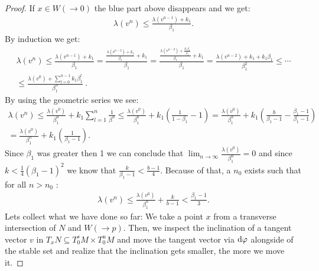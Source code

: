\begin{proof}
	If $x\in W(\to 0)$ the blue part above disappears and we get:
	\begin{align*}
		\lambda(v^n) \leq \frac{\lambda(v^{n-1})+k_1}{\beta_1}.
	\end{align*} By induction we get:
	\begin{align}
		\lambda(v^n)\leq \frac{\lambda(v^{n-1})+k_1}{\beta_1}=\frac{\frac{\lambda(v^{n-2})+k_1}{\beta_1}+k_1}{\beta_1}= \frac{\frac{\lambda(v^{n-2})+\frac{k_1 \beta_1}{\beta_1}}{\beta_1}+k_1}{\beta_1} =\frac{\lambda(v^{n-2})+k_1+ k_1 \beta_1}{\beta_1^2}\leq \cdots \nonumber \\
		\leq \frac{\lambda(v^0)+\sum_{l=0}^{n-1}k_1 \beta_1^l}{\beta_1^n}~. \label{eq: proof lambda lemma estimate lambda(v^n) with x=q}
	\end{align} By using the geometric series we see:
	\begin{align*}
		\lambda(v^n)\leq \frac{\lambda(v^0)}{\beta_1^n}+k_1\sum_{l=1}^n\frac{1}{\beta^n} \leq \frac{\lambda(v^0)}{\beta_1^n}+k_1(\frac{1}{1-\beta_1}-1)=
		\frac{\lambda(v^0)}{\beta_1^n}+k_1(\frac{b}{\beta_1-1}-\frac{\beta_1-1}{\beta_1-1}) \\ =\frac{\lambda(v^0)}{\beta_1^n}+k_1(\frac{1}{\beta_1-1}).
	\end{align*}
	Since $\beta_1$ was greater then 1 we can conclude that $\lim_{n \to \infty}\frac{\lambda(v^0)}{\beta_1^n}=0$ and since $k<\frac{1}{4}(\beta_1-1)^2$ we know that $\frac{k}{\beta_1-1}<\frac{b-1}{4}$. Because of that, a $n_0$ exists such that for all $n>n_0$ :
	\begin{align*}
		\lambda(v^n)\leq \frac{\lambda(v^0)}{\beta_1^n}+\frac{k}{b-1}< \frac{\beta_1-1}{3}.
	\end{align*}  
	Lets collect what we have done so far: We take a point $x$ from a transverse intersection of $N$ and $W(\to p)$. Then, we inspect the inclination of a tangent vector $v$ in ${T_xN\subseteq T^s_0M\times T^u_0M}$ and move the tangent vector via $\mathop{}\!\mathrm{d} \varphi$ alongside of the stable set and realize that the inclination gets smaller, the more we move it. 
	
	
	
	
	

\end{proof}
